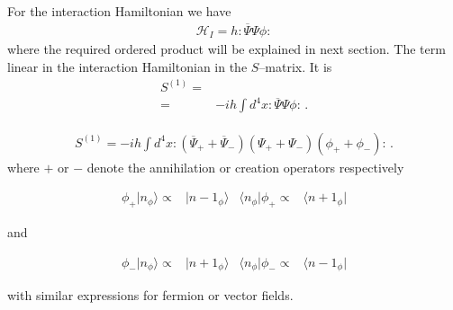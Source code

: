 For the interaction Hamiltonian we have
\begin{align}
\label{eq:hppp}
  \mathcal{H}_I=h:\overline{\Psi}\Psi\phi:
\end{align}
where the required ordered product will be explained in next section.
The term linear in the interaction Hamiltonian in the $S$--matrix.  It is
\begin{align}
  S^{(1)}=\nonumber\\
=&-i h \int d^4x:\overline{\Psi}\Psi\phi:\,.
\end{align}

\begin{align}
  S^{(1)}=-i h \int d^4x:(\overline{\Psi}_++\overline{\Psi}_-)(\Psi_++\Psi_-)(\phi_++\phi_-):\,.
\end{align}
where $+$ or $-$ denote the annihilation or creation operators respectively

\begin{align}
 \phi_{+} | n_{\phi} \rangle  \propto& |n-1_{\phi}\rangle & \langle n_{\phi}|\phi_{+} \propto& \langle n+1_{\phi}|
\end{align}

and

\begin{align}
 \phi_{-} |n_{\phi}\rangle  \propto& |n+1_{\phi}\rangle&  \langle n_{\phi}| \phi_{-} \propto& \langle n-1_{\phi}|
\end{align}

with similar expressions for fermion or vector fields.


